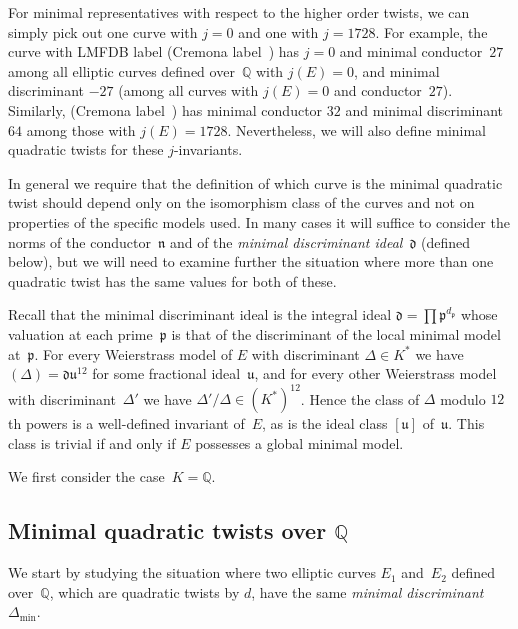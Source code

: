 \documentclass{article}
\theoremstyle{remark}
\def\Q{{\mathbb Q}}
\def\d{{\mathfrak d}}
\def\n{{\mathfrak n}}
\def\p{{\mathfrak p}}
\def\u{{\mathfrak u}}
\newcommand{\lmfdbecLMFDB}[3]{\href{http://www.lmfdb.org/EllipticCurve/Q/#1.#2#3}{{\text{\rm#1.#2#3}}}}
\newcommand{\lmfdbecCremona}[3]{\href{http://www.lmfdb.org/EllipticCurve/Q/#1#2#3}{{\text{\rm#1#2#3}}}}
\begin{document}
For minimal representatives with respect to the higher order twists,
we can simply pick out one curve with $j=0$ and one with $j=1728$. For
example, the curve with LMFDB label \lmfdbecLMFDB{27}{a}{4} (Cremona
label~\lmfdbecCremona{27}{a}{3}) has $j=0$ and minimal conductor~$27$
among all elliptic curves defined over~$\Q$ with $j(E)=0$, and minimal
discriminant $-27$ (among all curves with $j(E)=0$ and
conductor~$27$).  Similarly, \lmfdbecLMFDB{32}{a}{3} (Cremona
label~\lmfdbecCremona{32}{a}{2}) has minimal conductor $32$ and
minimal discriminant~$64$ among those with $j(E)=1728$.  Nevertheless,
we will also define minimal quadratic twists for these $j$-invariants.

In general we require that the definition of which curve is the
minimal quadratic twist should depend only on the isomorphism class of
the curves and not on properties of the specific models used.  In many
cases it will suffice to consider the norms of the conductor~$\n$ and
of the \textit{minimal discriminant ideal}~$\d$ (defined below), but
we will need to examine further the situation where more than one
quadratic twist has the same values for both of these.

Recall that the minimal discriminant ideal is the integral ideal
$\d=\prod\p^{d_{\p}}$ whose valuation at each prime~$\p$ is that of the
discriminant of the local minimal model at~$\p$.  For every
Weierstrass model of $E$ with discriminant $\Delta\in K^*$ we have
$(\Delta)=\d\u^{12}$ for some fractional ideal~$\u$, and for every
other Weierstrass model with discriminant~$\Delta'$ we have
$\Delta'/\Delta\in (K^*)^{12}$.  Hence the class of $\Delta$ modulo
$12$th powers is a well-defined invariant of~$E$, as is the ideal
class $[\u]$ of~$\u$.  This class is trivial if and only if $E$
possesses a global minimal model.

We first consider the case~$K=\Q$.

\subsection{Minimal quadratic twists over \texorpdfstring{$\Q$}{\textbf Q}}

We start by studying the situation where two elliptic curves $E_1$
and~$E_2$ defined over~$\Q$, which are quadratic twists by $d$, have
the same \textit{minimal discriminant}~$\Delta_{\text{min}}$.
\end{document}
